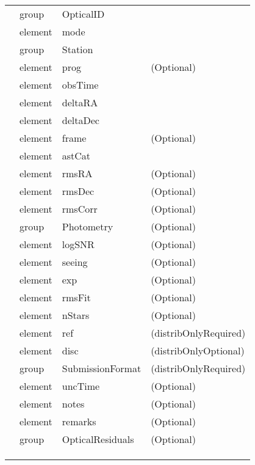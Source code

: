 \begin{tabularx}{\linewidth}{lllY}
{\begin{tabular}{|llll}
  \multicolumn{1}{c}{}& group & OpticalID  &  \\ 
  \multicolumn{1}{c}{}& element & mode  &  \\ 
  \multicolumn{1}{c}{}& group & Station  &  \\ 
  \multicolumn{1}{c}{}& element & prog  &  (Optional)  \\ 
  \multicolumn{1}{c}{}& element & obsTime  &  \\ 
  \multicolumn{1}{c}{}& element & deltaRA  &  \\ 
  \multicolumn{1}{c}{}& element & deltaDec  &  \\ 
  \multicolumn{1}{c}{}& element & frame  &  (Optional)  \\ 
  \multicolumn{1}{c}{}& element & astCat  &  \\ 
  \multicolumn{1}{c}{}& element & rmsRA  &  (Optional)  \\ 
  \multicolumn{1}{c}{}& element & rmsDec  &  (Optional)  \\ 
  \multicolumn{1}{c}{}& element & rmsCorr  &  (Optional)  \\ 
  \multicolumn{1}{c}{}& group & Photometry  &  (Optional)  \\ 
  \multicolumn{1}{c}{}& element & logSNR  &  (Optional)  \\ 
  \multicolumn{1}{c}{}& element & seeing  &  (Optional)  \\ 
  \multicolumn{1}{c}{}& element & exp  &  (Optional)  \\ 
  \multicolumn{1}{c}{}& element & rmsFit  &  (Optional)  \\ 
  \multicolumn{1}{c}{}& element & nStars  &  (Optional)  \\ 
  \multicolumn{1}{c}{}& element & ref  &  (distribOnlyRequired)  \\ 
  \multicolumn{1}{c}{}& element & disc  &  (distribOnlyOptional)  \\ 
  \multicolumn{1}{c}{}& group & SubmissionFormat  &  (distribOnlyRequired)  \\ 
  \multicolumn{1}{c}{}& element & uncTime  &  (Optional)  \\ 
  \multicolumn{1}{c}{}& element & notes  &  (Optional)  \\ 
  \multicolumn{1}{c}{}& element & remarks  &  (Optional)  \\ 
  \multicolumn{1}{c}{}& group & OpticalResiduals  &  (Optional)  \\  
  \hline 
  \end{tabular} } \\
  
 
\hline
\\
\\
\end{tabularx}

